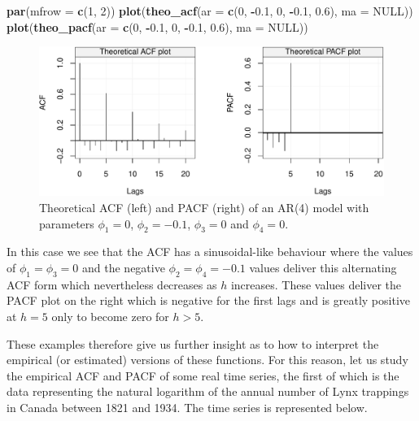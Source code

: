 \documentclass[]{book}
\newenvironment{Shaded}{\begin{snugshade}}{\end{snugshade}}
\newcommand{\KeywordTok}[1]{\textcolor[rgb]{0.13,0.29,0.53}{\textbf{#1}}}
\newcommand{\DataTypeTok}[1]{\textcolor[rgb]{0.13,0.29,0.53}{#1}}
\newcommand{\DecValTok}[1]{\textcolor[rgb]{0.00,0.00,0.81}{#1}}
\newcommand{\FloatTok}[1]{\textcolor[rgb]{0.00,0.00,0.81}{#1}}
\newcommand{\OtherTok}[1]{\textcolor[rgb]{0.56,0.35,0.01}{#1}}
\newcommand{\OperatorTok}[1]{\textcolor[rgb]{0.81,0.36,0.00}{\textbf{#1}}}
\newcommand{\NormalTok}[1]{#1}
\theoremstyle{definition}
\theoremstyle{definition}
\theoremstyle{definition}
\theoremstyle{remark}
\begin{document}
\begin{Shaded}
\begin{Highlighting}[]
\KeywordTok{par}\NormalTok{(}\DataTypeTok{mfrow =} \KeywordTok{c}\NormalTok{(}\DecValTok{1}\NormalTok{, }\DecValTok{2}\NormalTok{))}
\KeywordTok{plot}\NormalTok{(}\KeywordTok{theo_acf}\NormalTok{(}\DataTypeTok{ar =} \KeywordTok{c}\NormalTok{(}\DecValTok{0}\NormalTok{, }\OperatorTok{-}\FloatTok{0.1}\NormalTok{, }\DecValTok{0}\NormalTok{, }\OperatorTok{-}\FloatTok{0.1}\NormalTok{, }\FloatTok{0.6}\NormalTok{), }\DataTypeTok{ma =} \OtherTok{NULL}\NormalTok{))}
\KeywordTok{plot}\NormalTok{(}\KeywordTok{theo_pacf}\NormalTok{(}\DataTypeTok{ar =} \KeywordTok{c}\NormalTok{(}\DecValTok{0}\NormalTok{, }\OperatorTok{-}\FloatTok{0.1}\NormalTok{, }\DecValTok{0}\NormalTok{, }\OperatorTok{-}\FloatTok{0.1}\NormalTok{, }\FloatTok{0.6}\NormalTok{), }\DataTypeTok{ma =} \OtherTok{NULL}\NormalTok{))}
\end{Highlighting}
\end{Shaded}

\begin{figure}

{\centering \includegraphics{ts_files/figure-latex/unnamed-chunk-44-1} 

}

\caption{Theoretical ACF (left) and PACF (right) of an AR(4) model with parameters $\phi_1 = 0$, $\phi_2 = -0.1$, $\phi_3 = 0$ and $\phi_4 = 0$.}\label{fig:unnamed-chunk-44}
\end{figure}

In this case we see that the ACF has a sinusoidal-like behaviour where
the values of \(\phi_1 = \phi_3 = 0\) and the negative
\(\phi_2 = \phi_4 = -0.1\) values deliver this alternating ACF form
which nevertheless decreases as \(h\) increases. These values deliver
the PACF plot on the right which is negative for the first lags and is
greatly positive at \(h=5\) only to become zero for \(h > 5\).

These examples therefore give us further insight as to how to interpret
the empirical (or estimated) versions of these functions. For this
reason, let us study the empirical ACF and PACF of some real time
series, the first of which is the data representing the natural
logarithm of the annual number of Lynx trappings in Canada between 1821
and 1934. The time series is represented below.
\end{document}
